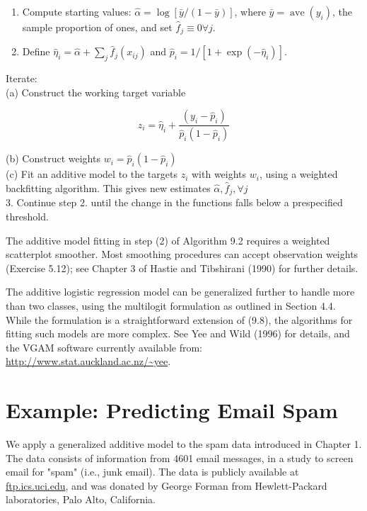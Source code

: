\documentclass[10pt]{article}
\begin{document}
\begin{enumerate}
  \item Compute starting values: $\hat{\alpha}=\log [\bar{y} /(1-\bar{y})]$, where $\bar{y}=\operatorname{ave}\left(y_{i}\right)$, the sample proportion of ones, and set $\hat{f}_{j} \equiv 0 \forall j$.
  \item Define $\hat{\eta}_{i}=\hat{\alpha}+\sum_{j} \hat{f}_{j}\left(x_{i j}\right)$ and $\hat{p}_{i}=1 /\left[1+\exp \left(-\hat{\eta}_{i}\right)\right]$.
\end{enumerate}

Iterate:\\
(a) Construct the working target variable

$$
z_{i}=\hat{\eta}_{i}+\frac{\left(y_{i}-\hat{p}_{i}\right)}{\hat{p}_{i}\left(1-\hat{p}_{i}\right)}
$$

(b) Construct weights $w_{i}=\hat{p}_{i}\left(1-\hat{p}_{i}\right)$\\
(c) Fit an additive model to the targets $z_{i}$ with weights $w_{i}$, using a weighted backfitting algorithm. This gives new estimates $\hat{\alpha}, \hat{f}_{j}, \forall j$\\
3. Continue step 2. until the change in the functions falls below a prespecified threshold.

The additive model fitting in step (2) of Algorithm 9.2 requires a weighted scatterplot smoother. Most smoothing procedures can accept observation weights (Exercise 5.12); see Chapter 3 of Hastie and Tibshirani (1990) for further details.

The additive logistic regression model can be generalized further to handle more than two classes, using the multilogit formulation as outlined in Section 4.4. While the formulation is a straightforward extension of (9.8), the algorithms for fitting such models are more complex. See Yee and Wild (1996) for details, and the VGAM software currently available from:\\
\href{http://www.stat.auckland.ac.nz/~yee}{http://www.stat.auckland.ac.nz/\~{}yee}.

\section*{Example: Predicting Email Spam}
We apply a generalized additive model to the spam data introduced in Chapter 1. The data consists of information from 4601 email messages, in a study to screen email for "spam" (i.e., junk email). The data is publicly available at \href{http://ftp.ics.uci.edu}{ftp.ics.uci.edu}, and was donated by George Forman from Hewlett-Packard laboratories, Palo Alto, California.
\end{document}
